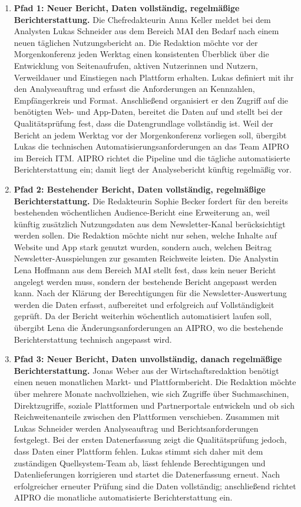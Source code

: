 \documentclass[11pt,a4paper]{article}
\begin{document}
\begin{enumerate}
  \item \textbf{Pfad 1: Neuer Bericht, Daten vollständig, regelmäßige Berichterstattung.} Die Chefredakteurin Anna Keller meldet bei dem Analysten Lukas Schneider aus dem Bereich MAI den Bedarf nach einem neuen t\"aglichen Nutzungsbericht an. Die Redaktion m\"ochte vor der Morgenkonferenz jeden Werktag einen konsistenten \"Uberblick \"uber die Entwicklung von Seitenaufrufen, aktiven Nutzerinnen und Nutzern, Verweildauer und Einstiegen nach Plattform erhalten. Lukas definiert mit ihr den Analyseauftrag und erfasst die Anforderungen an Kennzahlen, Empf\"angerkreis und Format. Anschlie{\ss}end organisiert er den Zugriff auf die ben\"otigten Web- und App-Daten, bereitet die Daten auf und stellt bei der Qualit\"atspr\"ufung fest, dass die Datengrundlage vollst\"andig ist. Weil der Bericht an jedem Werktag vor der Morgenkonferenz vorliegen soll, \"ubergibt Lukas die technischen Automatisierungsanforderungen an das Team AIPRO im Bereich ITM. AIPRO richtet die Pipeline und die t\"agliche automatisierte Berichterstattung ein; damit liegt der Analysebericht k\"unftig regelm\"a{\ss}ig vor.

  \item \textbf{Pfad 2: Bestehender Bericht, Daten vollständig, regelmäßige Berichterstattung.} Die Redakteurin Sophie Becker fordert f\"ur den bereits bestehenden w\"ochentlichen Audience-Bericht eine Erweiterung an, weil k\"unftig zus\"atzlich Nutzungsdaten aus dem Newsletter-Kanal ber\"ucksichtigt werden sollen. Die Redaktion m\"ochte nicht nur sehen, welche Inhalte auf Website und App stark genutzt wurden, sondern auch, welchen Beitrag Newsletter-Ausspielungen zur gesamten Reichweite leisten. Die Analystin Lena Hoffmann aus dem Bereich MAI stellt fest, dass kein neuer Bericht angelegt werden muss, sondern der bestehende Bericht angepasst werden kann. Nach der Kl\"arung der Berechtigungen f\"ur die Newsletter-Auswertung werden die Daten erfasst, aufbereitet und erfolgreich auf Vollst\"andigkeit gepr\"uft. Da der Bericht weiterhin w\"ochentlich automatisiert laufen soll, \"ubergibt Lena die \"Anderungsanforderungen an AIPRO, wo die bestehende Berichterstattung technisch angepasst wird.

  \item \textbf{Pfad 3: Neuer Bericht, Daten unvollständig, danach regelmäßige Berichterstattung.} Jonas Weber aus der Wirtschaftsredaktion ben\"otigt einen neuen monatlichen Markt- und Plattformbericht. Die Redaktion m\"ochte \"uber mehrere Monate nachvollziehen, wie sich Zugriffe \"uber Suchmaschinen, Direktzugriffe, soziale Plattformen und Partnerportale entwickeln und ob sich Reichweitenanteile zwischen den Plattformen verschieben. Zusammen mit Lukas Schneider werden Analyseauftrag und Berichtsanforde\-rungen festgelegt. Bei der ersten Datenerfassung zeigt die Qualit\"atspr\"ufung jedoch, dass Daten einer Plattform fehlen. Lukas stimmt sich daher mit dem zust\"andigen Quellsystem-Team ab, l\"asst fehlende Berechtigungen und Datenlieferungen korrigieren und startet die Datenerfassung erneut. Nach erfolgreicher erneuter Pr\"ufung sind die Daten vollst\"andig; anschlie{\ss}end richtet AIPRO die monatliche automatisierte Berichterstattung ein.


\end{enumerate}
\end{document}
